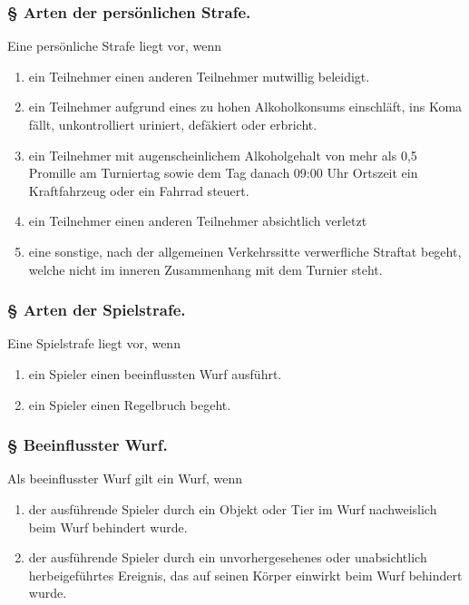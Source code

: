 \documentclass[a4paper, 12pt]{article}
\newcounter{arti}
\newcounter{absatz}
\newcounter{upper}
\newenvironment{para}[1]{%
    \subsubsection{§ \arabic{arti} {#1}.}
    \addtocounter{arti}{1}
    \newcommand{\up}{\textsuperscript{\arabic{upper}}\addtocounter{upper}{1}}
    \newcommand{\abs}{(\arabic{absatz})\addtocounter{absatz}{1}\setcounter{upper}{1}}
}{\setcounter{upper}{1}\setcounter{absatz}{1}}
\begin{document}
\begin{para}{Arten der persönlichen Strafe}
Eine persönliche Strafe liegt vor, wenn
\begin{enumerate}
\item ein Teilnehmer einen anderen Teilnehmer mutwillig beleidigt.
\item ein Teilnehmer aufgrund eines zu hohen Alkoholkonsums einschläft, ins Koma fällt, unkontrolliert uriniert, defäkiert oder erbricht.
\item ein Teilnehmer mit augenscheinlichem Alkoholgehalt von mehr als 0,5 Promille am Turniertag sowie dem Tag danach 09:00 Uhr Ortszeit ein Kraftfahrzeug oder ein Fahrrad steuert.
\item ein Teilnehmer einen anderen Teilnehmer absichtlich verletzt
\item eine sonstige, nach der allgemeinen Verkehrssitte verwerfliche Straftat begeht, welche nicht im inneren Zusammenhang mit dem Turnier steht.
\end{enumerate}
\end{para}

\begin{para}{Arten der Spielstrafe}
Eine Spielstrafe liegt vor, wenn
\begin{enumerate}
\item ein Spieler einen beeinflussten Wurf ausführt.
\item ein Spieler einen Regelbruch begeht.
\end{enumerate}
\end{para}

\begin{para}{Beeinflusster Wurf}
Als beeinflusster Wurf gilt ein Wurf, wenn
\begin{enumerate}
\item der ausführende Spieler durch ein Objekt oder Tier im Wurf nachweislich beim Wurf behindert wurde.
\item der ausführende Spieler durch ein unvorhergesehenes oder unabsichtlich herbeigeführtes Ereignis, das auf seinen Körper einwirkt beim Wurf behindert wurde.
\end{enumerate}
\end{para}
\end{document}
